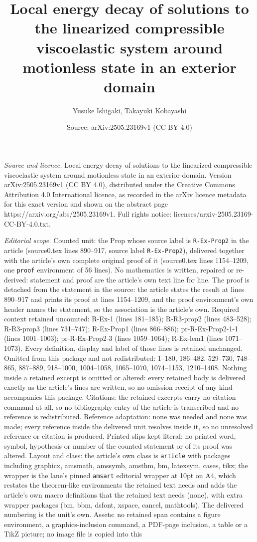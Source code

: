 \documentclass[10pt,a4paper]{amsart}
\title[Local energy decay of solutions to the linearized compressib]{Local energy decay of solutions to the linearized compressible viscoelastic system around motionless state in an exterior domain}
\author{Yusuke Ishigaki, Takayuki Kobayashi}
\date{Source: arXiv:2505.23169v1 (CC BY 4.0)}
\begin{document}
\maketitle

\noindent\emph{Source and licence.} Local energy decay of solutions to the linearized compressible viscoelastic system around motionless state in an exterior domain. Version arXiv:2505.23169v1 (CC BY 4.0), distributed under the Creative Commons Attribution 4.0 International licence, as recorded in the arXiv licence metadata for this exact version and shown on the abstract page https://arxiv.org/abs/2505.23169v1. Full rights notice: licenses/arxiv-2505.23169-CC-BY-4.0.txt.\par\smallskip

\noindent\textit{Editorial scope.} Counted unit: the Prop whose source label is \texttt{R-Ex-Prop2} in the article (source0.tex lines 890--917, source label \texttt{R-Ex-Prop2}), delivered together with the article's own complete original proof of it (source0.tex lines 1154--1209, one \texttt{proof} environment of 56 lines). No mathematics is written, repaired or re-derived: statement and proof are the article's own text line for line. The proof is detached from the statement in the source: the article states the result at lines 890--917 and prints its proof at lines 1154--1209, and the proof environment's own header names the statement, so the association is the article's own. Required context retained uncounted: R-Ex-1 (lines 181--185); R-R3-prop2 (lines 483--528); R-R3-prop3 (lines 731--747); R-Ex-Prop1 (lines 866--886); pr-R-Ex-Prop2-1-1 (lines 1001--1003); pr-R-Ex-Prop2-3 (lines 1059--1064); R-Ex-lem1 (lines 1071--1073). Every definition, display and label of those lines is retained unchanged. Omitted from this package and not redistributed: 1--180, 186--482, 529--730, 748--865, 887--889, 918--1000, 1004--1058, 1065--1070, 1074--1153, 1210--1408. Nothing inside a retained excerpt is omitted or altered: every retained body is delivered exactly as the article's lines are written, so no omission receipt of any kind accompanies this package. Citations: the retained excerpts carry no citation command at all, so no bibliography entry of the article is transcribed and no reference is redistributed. Reference adaptation: none was needed and none was made; every reference inside the delivered unit resolves inside it, so no unresolved reference or citation is produced. Printed slips kept literal: no printed word, symbol, hypothesis or number of the counted statement or of its proof was altered. Layout and class: the article's own class is \texttt{article} with packages including graphicx, amsmath, amssymb, amsthm, bm, latexsym, cases, tikz; the wrapper is the lane's pinned \texttt{amsart} editorial wrapper at 10pt on A4, which restates the theorem-like environments the retained text needs and adds the article's own macro definitions that the retained text needs (none), with extra wrapper packages (bm, bbm, dsfont, xspace, cancel, mathtools). The delivered numbering is the unit's own. Assets: no retained span contains a figure environment, a graphics-inclusion command, a PDF-page inclusion, a table or a TikZ picture; no image file is copied into this 
\end{document}

